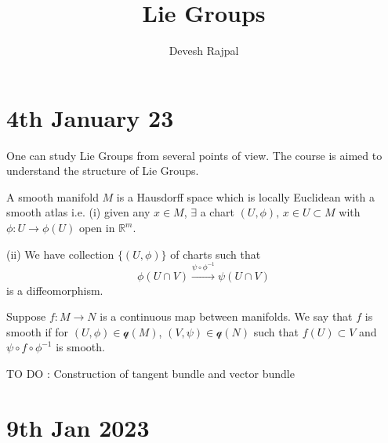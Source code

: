 \documentclass[11pt,a4paper]{scrarticle}
\title{\LARGE Lie Groups}
\author{\large Devesh Rajpal}
\date{}
\theoremstyle{definition}
\theoremstyle{greenbox}
\newcommand{\R}{\mathbb{R}}
\begin{document}
    \maketitle
    \tableofcontents
    \section{4th January 23}
    One can study Lie Groups from several points of view. The course is aimed to understand the structure of Lie Groups. 
    \begin{defn}
        A smooth manifold $ M $ is a Hausdorff space which is locally Euclidean with a smooth atlas i.e. (i) given any $ x \in M $, $ \exists  $ a chart $ (U, \phi) , \, x \in U \subset M$ with  $ \phi : U \to \phi (U) $ open in $ \R^{m} $.


        (ii) We have collection $ \{(U, \phi)\} $ of charts such that 
        \[ \phi ( U \cap V) \xrightarrow{\psi \circ \phi^{-1}} \psi ( U \cap V)\]
        is  a diffeomorphism.
        
    \end{defn}

    Suppose $ f : M \to N $ is a continuous map between manifolds. We say that $  f  $ is smooth if for $ (U, \phi) \in \mathcal{q}(M) $, $ (V, \psi) \in \mathcal{q}(N) $ such that $ f(U) \subset V $ and $ \psi \circ f \circ  \phi^{-1} $ is smooth. 
    
    TO DO : Construction of tangent bundle and vector bundle

    \section{9th Jan 2023}
\end{document}
